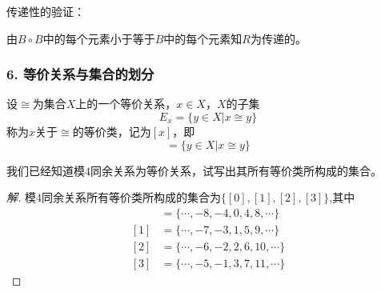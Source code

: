 \documentclass{beamer}
\begin{document}
\begin{CJK*}{UTF8}{gbsn}
\begin{frame}
      \pause
      传递性的验证：

      \pause{\small
      \[B\circ B=\begin{bmatrix}
        1&0&1&0&1&0\\
        0&1&0&1&0&0\\
        1&0&1&0&1&0\\
        0&1&0&1&0&0\\
        1&0&1&0&1&0\\
        0&0&0&0&0&1
      \end{bmatrix}\circ\begin{bmatrix}
        1&0&1&0&1&0\\
        0&1&0&1&0&0\\
        1&0&1&0&1&0\\
        0&1&0&1&0&0\\
        1&0&1&0&1&0\\
        0&0&0&0&0&1
      \end{bmatrix}=\begin{bmatrix}
        1&0&1&0&1&0\\
        0&1&0&1&0&0\\
        1&0&1&0&1&0\\
        0&1&0&1&0&0\\
        1&0&1&0&1&0\\
        0&0&0&0&0&1
      \end{bmatrix}
    \]}
    由$B\circ B$中的每个元素小于等于$B$中的每个元素知$R$为传递的。
  
\end{frame}
\begin{frame}
  \frametitle{6. 等价关系与集合的划分}
  \begin{Def}
    设$\cong$为集合$X$上的一个等价关系，$x\in X$，$X$的子集
    \[E_x=\{y\in X | x \cong y\}\]称为$x$关于$\cong$的\alert{等价类}，记为$[x]$，即
    \begin{equation*}
      [x] = \{y \in X | x \cong y\}
    \end{equation*}
  \end{Def}
  \vspace{-0.5cm}
  {\small\pause
  \begin{Ex}
    我们已经知道模$4$同余关系为等价关系，试写出其所有等价类所构成的集合。
  \end{Ex}\pause
  \begin{proof}[解]
    模$4$同余关系所有等价类所构成的集合为$\{[0],[1],[2],[3]\}$,其中
    \begin{align*}
      [0]&=\{\cdots,-8,-4,0,4,8,\cdots\}\\
      [1]&=\{\cdots,-7,-3,1,5,9,\cdots\}\\
      [2]&=\{\cdots,-6,-2,2,6,10,\cdots\}\\
      [3]&=\{\cdots,-5,-1,3,7,11,\cdots\}
    \end{align*}
  \end{proof}
  }
    

\end{frame}
\end{CJK*}
\end{document}
